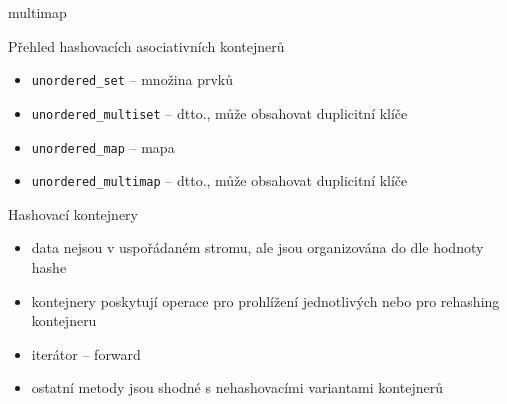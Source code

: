 \begin{frame}[fragile]
\begin{block}{multimap}
\end{block}
\end{frame}
















\begin{frame}[fragile]
\begin{block}{Přehled hashovacích asociativních kontejnerů}
\begin{itemize}
\item \lstinline|unordered_set| -- množina prvků
\item \lstinline|unordered_multiset| -- dtto., může obsahovat duplicitní klíče
\item \lstinline|unordered_map| -- mapa
\item \lstinline|unordered_multimap| -- dtto., může obsahovat duplicitní klíče
\end{itemize}
\end{block}
\end{frame}


\begin{frame}[fragile]
\begin{block}{Hashovací kontejnery}
\begin{itemize}
\item data nejsou v uspořádaném stromu, ale jsou organizována do  dle hodnoty hashe
\item kontejnery poskytují operace pro prohlížení jednotlivých  nebo pro rehashing kontejneru
\item iterátor -- forward
\item ostatní metody jsou shodné s nehashovacími variantami kontejnerů
\end{itemize}
\end{block}
\end{frame}


